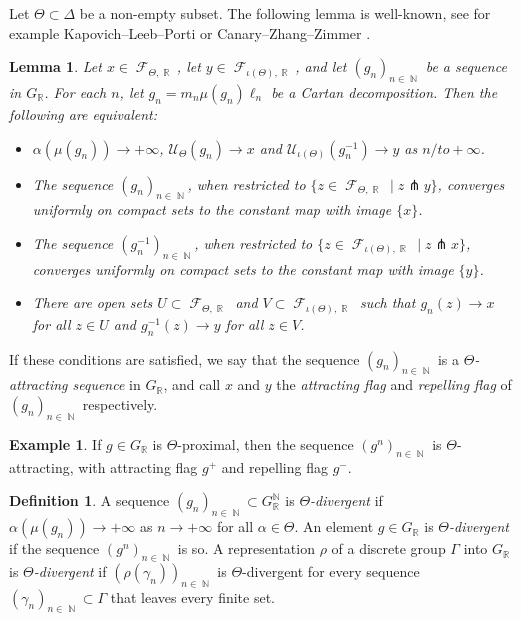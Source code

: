 \documentclass{amsart}
\theoremstyle{plain}
\newtheorem{lemma}[proposition]{Lemma}
\theoremstyle{definition}
\newtheorem{example}[proposition]{Example}
\newtheorem{definition}[proposition]{Definition}
\DeclareMathOperator{\Fc}{\mathcal{F}}
\DeclareMathOperator{\Nb}{{\mathbb{N}}}
\DeclareMathOperator{\Rb}{{\mathbb{R}}}
\newcommand{\1}{\mathbf{1}}
\begin{document}
Let $\Theta\subset\Delta$ be a non-empty subset. The following lemma is well-known, see for example Kapovich--Leeb--Porti \cite[Section~4]{KLP17} or Canary--Zhang--Zimmer \cite[Proposition~2.3]{CZZ2}.

\begin{lemma}\label{lemma: divergence in flag manifold}
Let $x\in\Fc_{\Theta,\Rb}$, let $y\in\Fc_{\iota(\Theta),\Rb}$, and let $(g_n)_{n\in\Nb}$ be a sequence in $G_{\Rb}$. For each $n$, let $g_n=m_n\mu(g_n)\ell_n$ be a Cartan decomposition. Then the following are equivalent:
\begin{itemize}
\item[(i)] $\alpha(\mu(g_n))\longrightarrow +\infty$, $\mathcal U_\Theta(g_n)\longrightarrow x$ and $\mathcal U_{\iota(\Theta)}(g_n^{-1})\longrightarrow y$ as $n/to +\infty$.
\item[(ii)] The sequence $(g_n)_{n\in\Nb}$, when restricted to $\{z\in \Fc_{\Theta,\Rb} \mid z\pitchfork y\}$, converges uniformly on compact sets to the constant map with image $\{x\}$.
\item[(iii)] The sequence $(g_n^{-1})_{n\in\Nb}$, when restricted to $\{z\in \Fc_{\iota(\Theta),\Rb} \mid z\pitchfork x\}$, converges uniformly on compact sets to the constant map with image $\{y\}$.
\item[(iv)]
\label{lemma: divergence in flag manifold: open sets}
There are open sets $U\subset\Fc_{\Theta,\Rb}$ and $V\subset\Fc_{\iota(\Theta),\Rb}$ such that $g_n(z)\to x$ for all $z\in U$ and $g_n^{-1}(z)\to y$ for all $z\in V$.
\end{itemize}
\end{lemma}

If these conditions are satisfied, we say that the sequence $(g_n)_{n\in \Nb}$ is a \emph{$\Theta$-attracting sequence} in $G_{\Rb}$, and call $x$ and $y$ the \emph{attracting flag} and \emph{repelling flag} of $(g_n)_{n\in \Nb}$ respectively.

\begin{example}
    If $g \in G_{\Rb}$ is $\Theta$-proximal, then the sequence $(g^n)_{n\in \Nb}$ is $\Theta$-attracting, with attracting flag $g^+$ and repelling flag $g^-$.
\end{example}

\begin{definition}\label{definition: divergent sequence and representation}
    A sequence $(g_n)_{n \in \Nb} \subset G_{\Rb}^{\Nb}$ is \emph{$\Theta$-divergent} if $\alpha(\mu(g_n)) \to +\infty$ as $n\to +\infty$ for all $\alpha \in \Theta$.
    An element $g \in G_{\Rb}$ is \emph{$\Theta$-divergent} if the sequence $(g^n)_{n \in \Nb}$ is so.
    A representation $\rho$ of a discrete group $\Gamma$ into $G_{\Rb}$ is \emph{$\Theta$-divergent} if $(\rho(\gamma_n))_{n \in \Nb}$ is $\Theta$-divergent for every sequence $(\gamma_n)_{n\in\Nb}\subset \Gamma$ that leaves every finite set.
\end{definition}
\end{document}
